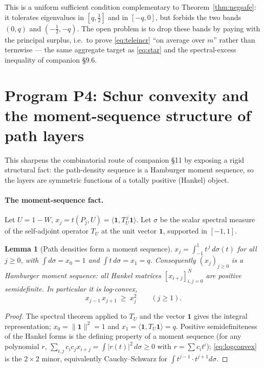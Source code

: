 \documentclass[11pt]{article}
\newtheorem{lemma}[theorem]{Lemma}
\theoremstyle{definition}
\newcommand{\1}{\mathbf{1}}
\begin{document}
This is a uniform sufficient condition complementary to
Theorem~\ref{thm:negsafe}: it tolerates eigenvalues in $[q,\tfrac12]$ and in
$[-q,0]$, but forbids the two bands $(0,q)$ and $(-\tfrac12,-q)$. The open
problem is to drop these bands by paying with the principal surplus, i.e.\ to
prove \eqref{eq:teleincr} ``on average over $m$'' rather than termwise --- the
same aggregate target as \eqref{eq:star} and the spectral-excess inequality of
companion \S9.6.

\section{Program P4: Schur convexity and the moment-sequence structure of path
layers}\label{sec:schur}

This sharpens the combinatorial route of companion \S11 by exposing a rigid
structural fact: the path-density sequence is a Hamburger moment sequence, so the
layers are symmetric functions of a totally positive (Hankel) object.

\paragraph{The moment-sequence fact.}
Let $U=1-W$, $x_j=t(P_j,U)=\langle\1,T_U^{\,j}\1\rangle$. Let $\sigma$ be the
scalar spectral measure of the self-adjoint operator $T_U$ at the unit vector
$\1$, supported in $[-1,1]$.

\begin{lemma}[Path densities form a moment sequence]\label{lem:moment}
$x_j=\int_{-1}^{1}t^{\,j}\,d\sigma(t)$ for all $j\ge0$, with
$\int d\sigma=x_0=1$ and $\int t\,d\sigma=x_1=q$. Consequently $(x_j)_{j\ge0}$ is
a Hamburger moment sequence: all Hankel matrices $[x_{i+j}]_{i,j=0}^{N}$ are
positive semidefinite. In particular it is log-convex,
\begin{equation}\label{eq:logconvex}
x_{j-1}\,x_{j+1}\ \ge\ x_j^2\qquad(j\ge1).
\end{equation}
\end{lemma}

\begin{proof}
The spectral theorem applied to $T_U$ and the vector $\1$ gives the integral
representation; $x_0=\|\1\|^2=1$ and $x_1=\langle\1,T_U\1\rangle=q$. Positive
semidefiniteness of the Hankel forms is the defining property of a moment
sequence (for any polynomial $r$, $\sum_{i,j}c_ic_j x_{i+j}=\int |r(t)|^2\,
d\sigma\ge0$ with $r=\sum c_it^i$); \eqref{eq:logconvex} is the $2\times2$ minor,
equivalently Cauchy--Schwarz for $\int t^{j-1}\cdot t^{j+1}d\sigma$.
\end{proof}
\end{document}
